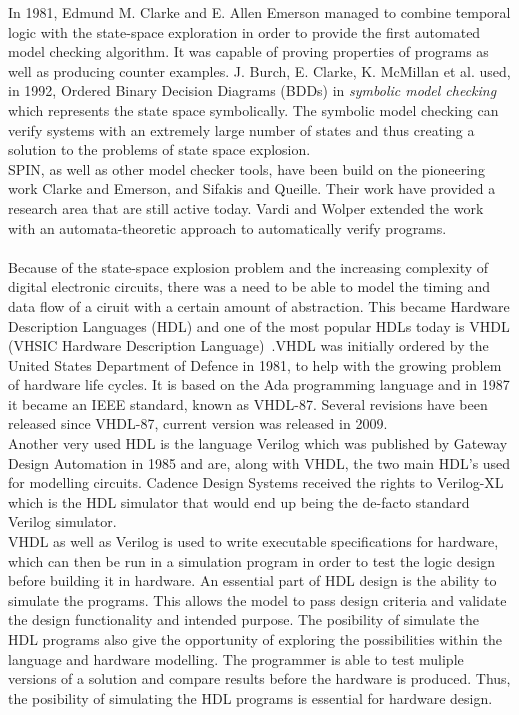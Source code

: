 In 1981, Edmund M. Clarke and E. Allen Emerson managed to combine temporal logic with the state-space exploration in order to provide the first automated model checking algorithm\cite{Clarke1981}. It was capable of proving properties of programs as well as producing counter examples.
J. Burch, E. Clarke, K. McMillan et al.\cite{Burch1992} used, in 1992, Ordered Binary Decision Diagrams (BDDs) in \textit{symbolic model checking} which represents the state space symbolically. The symbolic model checking can verify systems with an extremely large number of states and thus creating a solution to the problems of state space explosion.\\
SPIN, as well as other model checker tools, have been build on the pioneering work Clarke and Emerson\cite{Clarke1981}, and Sifakis and Queille\cite{Queille1982}. Their work have provided a research area that are still active today. Vardi and Wolper extended the work with an automata-theoretic approach to automatically verify programs\cite{Vardi1986}.\\\\

Because of the state-space explosion problem and the increasing complexity of digital electronic circuits, there was a need to be able to model the timing and data flow of a ciruit with a certain amount of abstraction. This became Hardware Description Languages (HDL) and one of the most popular HDLs today is VHDL (VHSIC Hardware Description Language)~\cite{VHDL}.VHDL was initially ordered by the United States Department of Defence in 1981, to help with the growing problem of hardware life cycles. It is based on the Ada programming language and in 1987 it became an IEEE standard, known as VHDL-87. Several revisions have been released since VHDL-87, current version was released in 2009.\\

Another very used HDL is the language Verilog which was published by Gateway Design Automation in 1985 and are, along with VHDL, the two main HDL's used for modelling circuits. Cadence Design Systems received the rights to Verilog-XL which is the HDL simulator that would end up being the de-facto standard Verilog simulator. \\
VHDL as well as Verilog is used to write executable specifications for hardware, which can then be run in a simulation program in order to test the logic design before building it in hardware. An essential part of HDL design is the ability to simulate the programs. This allows the model to pass design criteria and validate the design functionality and intended purpose. The posibility of simulate the HDL programs also give the opportunity of exploring the possibilities within the language and hardware modelling. The programmer is able to test muliple versions of a solution and compare results before the hardware is produced. Thus, the posibility of simulating the HDL programs is essential for hardware design. \\


